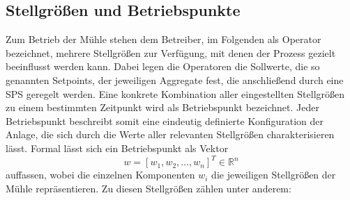 \subsection{Stellgrößen und Betriebspunkte} \label{sec:stellgroessen}
Zum Betrieb der Mühle stehen dem Betreiber, im Folgenden als Operator bezeichnet, mehrere Stellgrößen zur Verfügung, mit denen der Prozess gezielt beeinflusst werden kann. Dabei legen die Operatoren die Sollwerte, die so genannten Setpoints, der jeweiligen Aggregate fest, die anschließend durch eine \ac{SPS} geregelt werden.
Eine konkrete Kombination aller eingestellten Stellgrößen zu einem bestimmten Zeitpunkt wird als Betriebspunkt bezeichnet. Jeder Betriebspunkt beschreibt somit eine eindeutig definierte Konfiguration der Anlage, die sich durch die Werte aller relevanten Stellgrößen charakterisieren lässt. Formal lässt sich ein Betriebspunkt als Vektor
%
\begin{equation}
    w = [w_1, w_2, \ldots, w_n]^T \in \mathbb{R}^n
    \label{eq:betriebspunkt}
\end{equation}
%
auffassen, wobei die einzelnen Komponenten $w_i$ die jeweiligen Stellgrößen der Mühle repräsentieren. Zu diesen Stellgrößen zählen unter anderem: 
%
